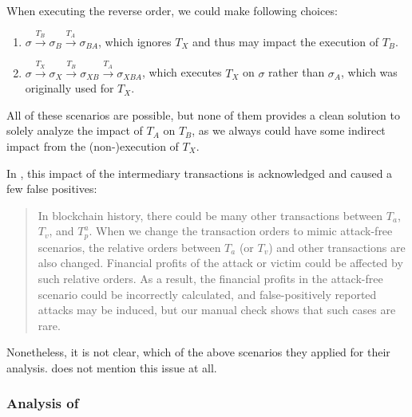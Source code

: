 \documentclass[draft,final]{vutinfth} %
\begin{document}
When executing the reverse order, we could make following choices:

\begin{enumerate}
    \item $\sigma \xrightarrow{T_B} \sigma_B \xrightarrow{T_A} \sigma_{BA}$, which ignores $T_X$ and thus may impact the execution of $T_B$.
    \item $\sigma \xrightarrow{T_X} \sigma_X \xrightarrow{T_B} \sigma_{XB} \xrightarrow{T_A} \sigma_{XBA}$, which executes $T_X$  on $\sigma$ rather than $\sigma_A$, which was originally used for $T_X$.
\end{enumerate}


All of these scenarios are possible, but none of them provides a clean solution to solely analyze the impact of $T_A$ on $T_B$, as we always could have some indirect impact from the (non-)execution of $T_X$.

In \cite{zhang_combatting_2023}, this impact of the intermediary transactions is acknowledged and caused a few false positives:

\begin{quote}
    In blockchain history, there could be many other transactions between $T_a$, $T_v$, and $T_p^a$. When we change the transaction orders to mimic attack-free scenarios, the relative orders between $T_a$ (or $T_v$) and other transactions are also changed. Financial profits of the attack or victim could be affected by such relative orders. As a result, the financial profits in the attack-free scenario could be incorrectly calculated, and false-positively reported attacks may be induced, but our manual check shows that such cases are rare.
\end{quote}

Nonetheless, it is not clear, which of the above scenarios they applied for their analysis. \cite{torres_frontrunner_2021} does not mention this issue at all.


\subsubsection{Analysis of \cite{zhang_combatting_2023}}
\end{document}
